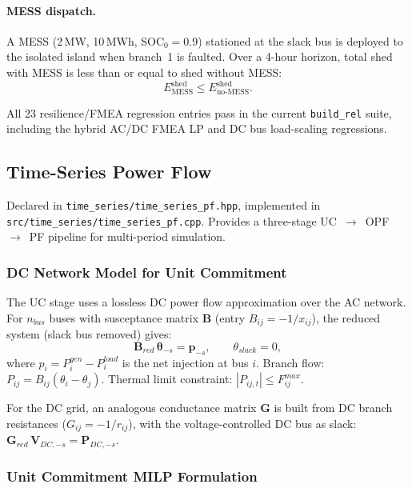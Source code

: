 \paragraph{MESS dispatch.}
A MESS (2\,MW, 10\,MWh, SOC$_0=0.9$) stationed at the slack bus is deployed
to the isolated island when branch~1 is faulted.  Over a 4-hour horizon,
total shed with MESS is less than or equal to shed without MESS:
\[
  E^{\text{shed}}_{\mathrm{MESS}} \leq E^{\text{shed}}_{\mathrm{no\text{-}MESS}}.
\]

\noindent
All 23 resilience/FMEA regression entries pass in the current
\texttt{build\_rel} suite, including the hybrid AC/DC FMEA LP and DC bus
load-scaling regressions.

\subsection{Time-Series Power Flow}
\label{sec:time-series-pf}

Declared in \texttt{time\_series/time\_series\_pf.hpp},
implemented in \texttt{src/time\_series/time\_series\_pf.cpp}.  Provides a
three-stage UC~$\to$~OPF~$\to$~PF pipeline for multi-period simulation.

\subsubsection{DC Network Model for Unit Commitment}

The UC stage uses a lossless DC power flow approximation over the AC network.
For $n_{bus}$ buses with susceptance matrix $\mathbf{B}$ (entry
$B_{ij} = -1/x_{ij}$), the reduced system (slack bus removed) gives:
\begin{equation}
  \mathbf{B}_{red}\,\boldsymbol{\theta}_{-s} = \mathbf{p}_{-s},
  \qquad \theta_{slack} = 0,
  \label{eq:dc-pf-uc}
\end{equation}
where $p_i = P_i^{gen} - P_i^{load}$ is the net injection at bus $i$.
Branch flow: $P_{ij} = B_{ij}(\theta_i - \theta_j)$.
Thermal limit constraint: $|P_{ij,t}| \leq F_{ij}^{max}$.

For the DC grid, an analogous conductance matrix $\mathbf{G}$ is built from
DC branch resistances ($G_{ij} = -1/r_{ij}$), with the voltage-controlled
DC bus as slack: $\mathbf{G}_{red}\,\mathbf{V}_{DC,-s} = \mathbf{P}_{DC,-s}$.

\subsubsection{Unit Commitment MILP Formulation}

